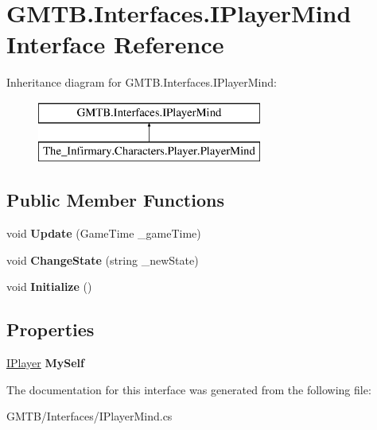 \hypertarget{interface_g_m_t_b_1_1_interfaces_1_1_i_player_mind}{}\section{G\+M\+T\+B.\+Interfaces.\+I\+Player\+Mind Interface Reference}
\label{interface_g_m_t_b_1_1_interfaces_1_1_i_player_mind}
Inheritance diagram for G\+M\+T\+B.\+Interfaces.\+I\+Player\+Mind\+:\begin{figure}[H]
\begin{center}
\leavevmode
\includegraphics[height=2.000000cm]{interface_g_m_t_b_1_1_interfaces_1_1_i_player_mind}
\end{center}
\end{figure}
\subsection*{Public Member Functions}
\begin{DoxyCompactItemize}
\item 
\mbox{\label{interface_g_m_t_b_1_1_interfaces_1_1_i_player_mind_a4fa78251d7949eb4e446efe9f9727377}} 
void {\bfseries Update} (Game\+Time \+\_\+game\+Time)
\item 
\mbox{\label{interface_g_m_t_b_1_1_interfaces_1_1_i_player_mind_ab3af495180d33a8e0bb9e1cf3fa0efd5}} 
void {\bfseries Change\+State} (string \+\_\+new\+State)
\item 
\mbox{\label{interface_g_m_t_b_1_1_interfaces_1_1_i_player_mind_a59cd1af5e988606cc8f3554c1c27cee9}} 
void {\bfseries Initialize} ()
\end{DoxyCompactItemize}
\subsection*{Properties}
\begin{DoxyCompactItemize}
\item 
\mbox{\label{interface_g_m_t_b_1_1_interfaces_1_1_i_player_mind_a0f130c975fe0b58938afb6581553412c}} 
\mbox{\hyperlink{interface_g_m_t_b_1_1_interfaces_1_1_i_player}{I\+Player}} {\bfseries My\+Self}
\end{DoxyCompactItemize}


The documentation for this interface was generated from the following file\+:\begin{DoxyCompactItemize}
\item 
G\+M\+T\+B/\+Interfaces/I\+Player\+Mind.\+cs\end{DoxyCompactItemize}
